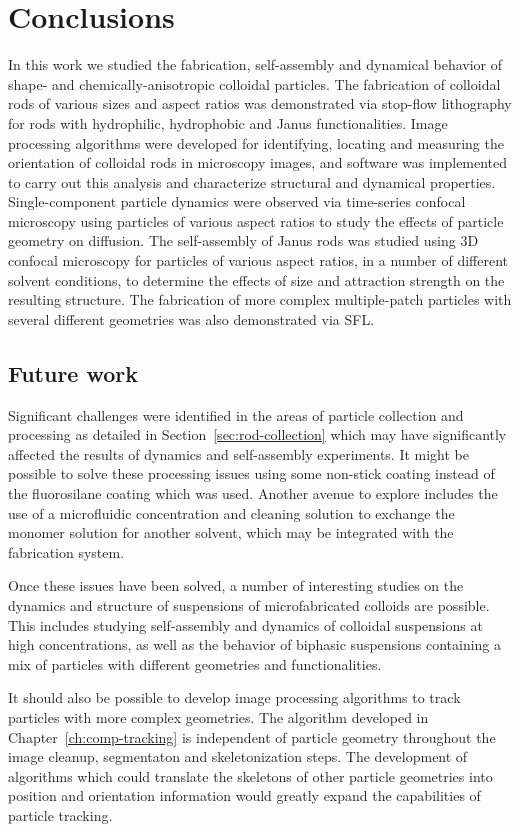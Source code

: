 \chapter{Conclusions}

In this work we studied the fabrication, self-assembly and dynamical behavior
of shape- and chemically-anisotropic colloidal particles.  The fabrication 
of colloidal rods of various sizes and aspect ratios was demonstrated via
stop-flow lithography for rods with
hydrophilic, hydrophobic and Janus functionalities.  Image processing algorithms
were developed for identifying, locating and measuring the orientation of 
colloidal rods in microscopy images, and software was implemented to carry out
this analysis and characterize structural and dynamical properties.
Single-component particle 
dynamics were observed via time-series confocal microscopy using particles of 
various aspect ratios to study the effects of particle geometry on diffusion.
The self-assembly of Janus rods was studied using
3D confocal microscopy for particles of various aspect ratios,
in a number of different solvent conditions, to determine the effects of size 
and attraction strength on the resulting structure.  The fabrication of more complex
multiple-patch particles with several different geometries was also demonstrated via SFL.

\section{Future work}

Significant challenges were identified in the areas of particle collection and processing as 
detailed in Section~\ref{sec:rod-collection} which may have significantly affected the 
results of dynamics and self-assembly experiments.  It might be possible to solve these
processing issues using some non-stick coating instead of the fluorosilane coating 
which was used.  Another avenue to explore includes the use of a microfluidic concentration
and cleaning solution to exchange the monomer solution for another solvent, 
which may be integrated with the fabrication system.  

Once these issues have been solved, a number of interesting studies on the dynamics and
structure of suspensions of microfabricated colloids are possible.  This includes studying 
self-assembly and dynamics of colloidal suspensions at high concentrations, as well as 
the behavior of biphasic suspensions containing a mix of particles with different geometries and
functionalities.~\cite{?}

It should also be possible to develop image processing algorithms to track particles with more
complex geometries.  The algorithm developed in Chapter~\ref{ch:comp-tracking} is independent 
of particle geometry throughout the image cleanup, segmentaton and skeletonization steps.
The development of algorithms which could translate the skeletons of other particle 
geometries into position and orientation information would greatly expand the 
capabilities of particle tracking.

